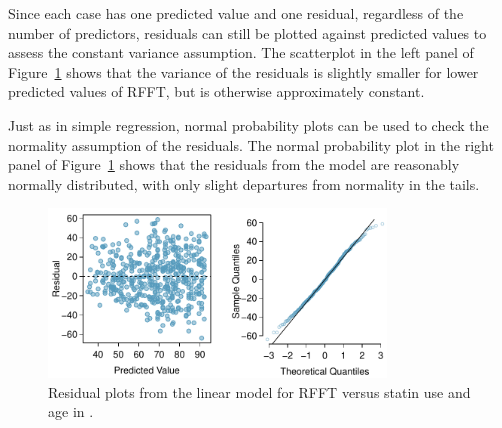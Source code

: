 Since each case has one predicted value and one residual, regardless of the number of predictors, residuals can still be plotted against predicted values to assess the constant variance assumption. The scatterplot in the left panel of Figure~\ref{prevendStatinAgeResidNormPlot} shows that the variance of the residuals is slightly smaller for lower predicted values of RFFT, but is otherwise approximately constant.

Just as in simple regression, normal probability plots can be used to check the normality assumption of the residuals. The normal probability plot in the right panel of Figure~\ref{prevendStatinAgeResidNormPlot} shows that the residuals from the model are reasonably normally distributed, with only slight departures from normality in the tails.

\begin{figure}[h!]
	\centering
	\includegraphics[width=0.8\textwidth]
	{ch_multiple_linear_regression_oi_biostat/figures/prevendStatinAgeResidNormPlot/prevendStatinAgeResidNormPlot.pdf}
	\caption{Residual plots from the linear model for RFFT versus statin use and age in .}
	\label{prevendStatinAgeResidNormPlot}
\end{figure}

